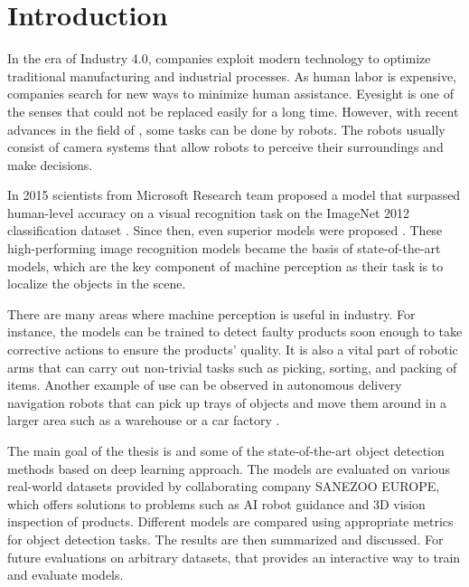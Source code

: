 \chapter{Introduction}

In the era of Industry 4.0, companies exploit modern technology to optimize
traditional manufacturing and industrial processes. As human labor is expensive,
companies search for new ways to minimize human assistance. Eyesight is one of
the senses that could not be replaced easily for a long time. However, with
recent advances in the field of , some tasks can be done by
robots. The robots usually consist of camera systems that allow robots to
perceive their surroundings and make decisions.

In 2015 scientists from Microsoft Research team proposed a 
model \cite{surp2015} that surpassed human-level accuracy on a visual
recognition task on the ImageNet 2012 classification dataset \cite{imagenet}.
Since then, even superior models were proposed \cite{resnet, efficientnet}.
These high-performing image recognition models became the basis of
state-of-the-art  models, which are the key component of
machine perception as their task is to localize the objects in the scene.

There are many areas where machine perception is useful in industry. For
instance, the models can be trained to detect faulty products soon enough to
take corrective actions to ensure the products' quality. It is also a vital part
of robotic arms that can carry out non-trivial tasks such as picking, sorting,
and packing of items. Another example of use can be observed in autonomous
delivery navigation robots that can pick up trays of objects and move them
around in a larger area such as a warehouse or a car factory \cite{bmw}.

The main goal of the thesis is  and  some of
the state-of-the-art object detection methods based on deep learning approach.
The models are evaluated on various real-world datasets provided by
collaborating company SANEZOO EUROPE, which offers solutions to problems such
as AI robot guidance and 3D vision inspection of products. Different models are
compared using appropriate metrics for object detection tasks. The results are
then summarized and discussed. For future evaluations on arbitrary datasets,
 that provides an interactive way to train
and evaluate models.

